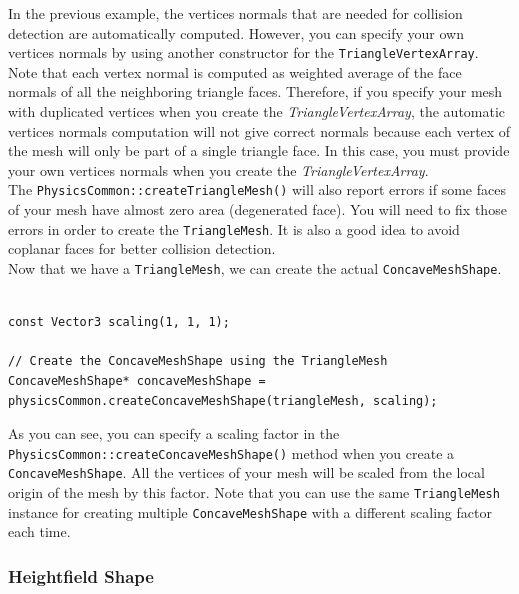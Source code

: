 \documentclass[a4paper,12pt]{article}
\begin{document}
  In the previous example, the vertices normals that are needed for collision detection are automatically computed. However, you can specify your own
  vertices normals by using another constructor for the \texttt{TriangleVertexArray}. Note that each vertex normal is computed as weighted average
  of the face normals of all the neighboring triangle faces. Therefore, if you specify your mesh with duplicated vertices when you create the
  \emph{TriangleVertexArray}, the automatic vertices normals computation will not give correct normals because each vertex of the mesh will only be
  part of a single triangle face. In this case, you must provide your own vertices normals when you create the \emph{TriangleVertexArray}. \\

  The \texttt{PhysicsCommon::createTriangleMesh()} will also report errors if some faces of your mesh have almost zero area
  (degenerated face). You will need to fix those errors in order to create the \texttt{TriangleMesh}. It is also a good idea to avoid coplanar faces
  for better collision detection. \\

  Now that we have a \texttt{TriangleMesh}, we can create the actual \texttt{ConcaveMeshShape}. \\

  \begin{lstlisting}

const Vector3 scaling(1, 1, 1);

// Create the ConcaveMeshShape using the TriangleMesh
ConcaveMeshShape* concaveMeshShape = physicsCommon.createConcaveMeshShape(triangleMesh, scaling);
  \end{lstlisting}

  \vspace{0.6cm}

  \begin{sloppypar}
  As you can see, you can specify a scaling factor in the \texttt{PhysicsCommon::createConcaveMeshShape()} method when you create a
  \texttt{Concave\allowbreak MeshShape}. All the vertices of your mesh will be scaled from the local origin of the mesh by this factor.
  Note that you can use the same \texttt{TriangleMesh} instance for creating multiple \texttt{ConcaveMeshShape} with a different scaling 
  factor each time. \\
  \end{sloppypar}

  \subsubsection{Heightfield Shape}
\end{document}
